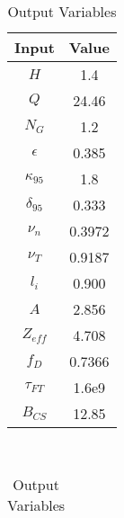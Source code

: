 \begin{table}[b!]
\centering
\caption{DEMO Steady Variables}
\hfill
\begin{subtable}[t]{0.4\textwidth}
\centering
\caption{Input Variables} ~\\
\begin{tabular}{ c|c }

Input            & Value           \\
\hline
$H$              & 1.4             \\
$Q$              & 24.46           \\
$N_{G}$          & 1.2             \\
$\epsilon$       & 0.385           \\
$\kappa_{95}$    & 1.8             \\
$\delta_{95}$    & 0.333           \\
$\nu_{n}$        & 0.3972          \\
$\nu_{T}$        & 0.9187          \\
$l_{i}$          & 0.900             \\
$A$              & 2.856           \\
$Z_{eff}$        & 4.708           \\
$f_{D}$          & 0.7366          \\
$\tau_{FT}$      & 1.6e9           \\
$B_{CS}$         & 12.85           \\

\end{tabular}
\end{subtable}
\hfill
\begin{subtable}[t]{0.5\textwidth}
\centering
\caption{Output Variables} ~\\
\begin{tabular}{ c|c|c|c }


\end{tabular}
\end{subtable}
\end{table}
